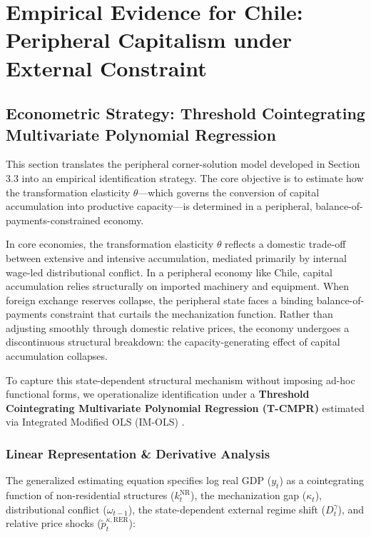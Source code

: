 \section{Empirical Evidence for Chile: Peripheral Capitalism under External Constraint}

\subsection{Econometric Strategy: Threshold Cointegrating Multivariate Polynomial Regression}

This section translates the peripheral corner-solution model developed in Section 3.3 into an empirical identification strategy. The core objective is to estimate how the transformation elasticity $\theta$---which governs the conversion of capital accumulation into productive capacity---is determined in a peripheral, balance-of-payments-constrained economy.

In core economies, the transformation elasticity $\theta$ reflects a domestic trade-off between extensive and intensive accumulation, mediated primarily by internal wage-led distributional conflict. In a peripheral economy like Chile, capital accumulation relies structurally on imported machinery and equipment. When foreign exchange reserves collapse, the peripheral state faces a binding balance-of-payments constraint that curtails the mechanization function. Rather than adjusting smoothly through domestic relative prices, the economy undergoes a discontinuous structural breakdown: the capacity-generating effect of capital accumulation collapses.

To capture this state-dependent structural mechanism without imposing ad-hoc functional forms, we operationalize identification under a \textbf{Threshold Cointegrating Multivariate Polynomial Regression (T-CMPR)} estimated via Integrated Modified OLS (IM-OLS) \citep{VogelsangWagner2024}.

\subsubsection{Linear Representation \& Derivative Analysis}

The generalized estimating equation specifies log real GDP ($y_t$) as a cointegrating function of non-residential structures ($k_t^{\text{NR}}$), the mechanization gap ($\kappa_t$), distributional conflict ($\omega_{t-1}$), the state-dependent external regime shift ($D_t^{\gamma}$), and relative price shocks ($\tilde{p}_t^{\kappa, \text{RER}}$):

